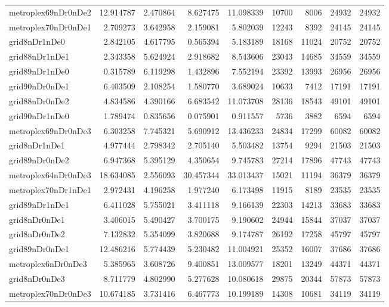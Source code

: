 \begin{longtable}{|l|r|r|r|r|r|r|r|r|}
metroplex69nDr0nDe2 & 12.914787 & 2.470864 & 8.627475 & 11.098339 & 10700 & 8006 & 24932 & 24932 \\
metroplex70nDr0nDe1 & 2.709273 & 3.642958 & 2.159081 & 5.802039 & 12243 & 8392 & 24145 & 24145 \\
grid8nDr1nDe0 & 2.842105 & 4.617795 & 0.565394 & 5.183189 & 18168 & 11024 & 20752 & 20752 \\
grid88nDr1nDe1 & 2.343358 & 5.624924 & 2.918682 & 8.543606 & 23043 & 14685 & 34559 & 34559 \\
grid89nDr1nDe0 & 0.315789 & 6.119298 & 1.432896 & 7.552194 & 23392 & 13993 & 26956 & 26956 \\
grid90nDr0nDe1 & 6.403509 & 2.108254 & 1.580770 & 3.689024 & 10633 & 7412 & 17191 & 17191 \\
grid88nDr0nDe2 & 4.834586 & 4.390166 & 6.683542 & 11.073708 & 28136 & 18543 & 49101 & 49101 \\
grid90nDr1nDe0 & 1.789474 & 0.835656 & 0.075901 & 0.911557 & 5736 & 3882 & 6594 & 6594 \\
metroplex69nDr0nDe3 & 6.303258 & 7.745321 & 5.690912 & 13.436233 & 24834 & 17299 & 60082 & 60082 \\
grid8nDr1nDe1 & 4.977444 & 2.798342 & 2.705140 & 5.503482 & 13754 & 9294 & 21503 & 21503 \\
grid89nDr0nDe2 & 6.947368 & 5.395129 & 4.350654 & 9.745783 & 27214 & 17896 & 47743 & 47743 \\
metroplex64nDr0nDe3 & 18.634085 & 2.556093 & 30.457344 & 33.013437 & 15021 & 11194 & 36379 & 36379 \\
metroplex70nDr1nDe1 & 2.972431 & 4.196258 & 1.977240 & 6.173498 & 11915 & 8189 & 23535 & 23535 \\
grid89nDr1nDe1 & 6.411028 & 5.755021 & 3.411118 & 9.166139 & 22303 & 14213 & 33683 & 33683 \\
grid8nDr0nDe1 & 3.406015 & 5.490427 & 3.700175 & 9.190602 & 24944 & 15844 & 37037 & 37037 \\
grid8nDr0nDe2 & 7.132832 & 5.354099 & 3.820688 & 9.174787 & 26192 & 17258 & 45797 & 45797 \\
grid89nDr0nDe1 & 12.486216 & 5.774439 & 5.230482 & 11.004921 & 25352 & 16007 & 37686 & 37686 \\
metroplex6nDr0nDe3 & 5.385965 & 3.608726 & 9.400851 & 13.009577 & 18201 & 13249 & 44371 & 44371 \\
grid8nDr0nDe3 & 8.711779 & 4.802990 & 5.277628 & 10.080618 & 29875 & 20344 & 57873 & 57873 \\
metroplex70nDr0nDe3 & 10.674185 & 3.731416 & 6.467773 & 10.199189 & 14308 & 10681 & 34119 & 34119 \\

\end{longtable}
